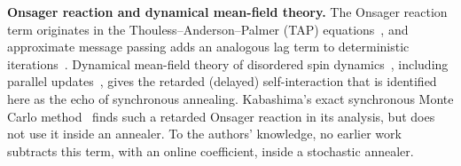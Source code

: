 \noindent\textbf{Onsager reaction and dynamical mean-field theory.} The Onsager reaction term originates in the Thouless--Anderson--Palmer (TAP) equations~\cite{thouless1977solution}, and approximate message passing adds an analogous lag term to deterministic iterations~\cite{bolthausen2014iterative}. Dynamical mean-field theory of disordered spin dynamics~\cite{sompolinsky1982relaxational,eissfeller1992new}, including parallel updates~\cite{coolen2001statistical}, gives the retarded (delayed) self-interaction that is identified here as the echo of synchronous annealing. Kabashima's exact synchronous Monte Carlo method~\cite{kabashima2026synchronous} finds such a retarded Onsager reaction in its analysis, but does not use it inside an annealer. To the authors' knowledge, no earlier work subtracts this term, with an online coefficient, inside a stochastic annealer.
